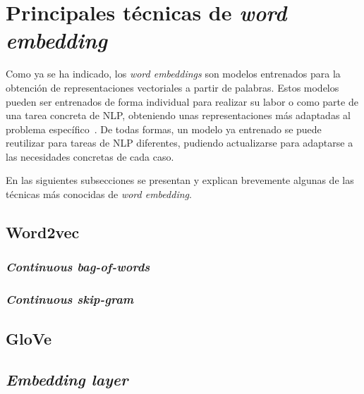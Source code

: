 \section{Principales técnicas de \textit{word embedding}}
\label{sec:techniques}

Como ya se ha indicado, los \textit{word embeddings} son modelos entrenados para
la obtención de representaciones vectoriales a partir de palabras. Estos modelos
pueden ser entrenados de forma individual para realizar su labor o como parte de
una tarea concreta de NLP, obteniendo unas representaciones más adaptadas al
problema específico~\cite{techniques}. De todas formas, un modelo ya entrenado
se puede reutilizar para tareas de NLP diferentes, pudiendo actualizarse para
adaptarse a las necesidades concretas de cada caso.

En las siguientes subsecciones se presentan y explican brevemente algunas de las
técnicas más conocidas de \textit{word embedding}.

\subsection{Word2vec}

\subsubsection{\textit{Continuous bag-of-words}}

\subsubsection{\textit{Continuous skip-gram}}

\subsection{GloVe}

\subsection{\textit{Embedding layer}}
